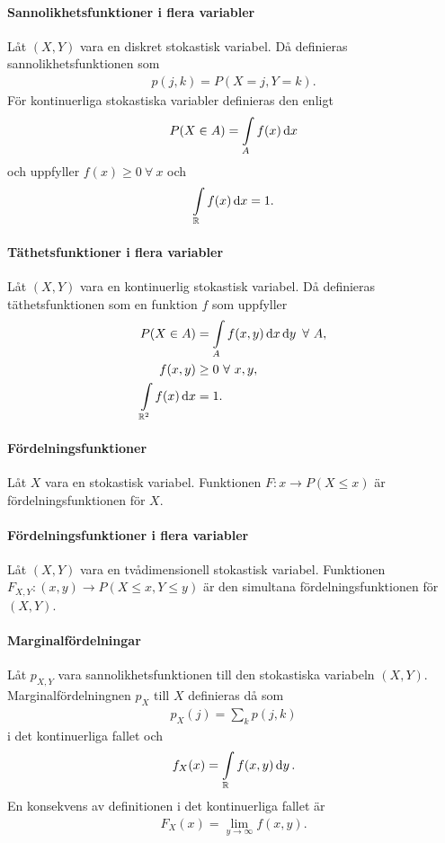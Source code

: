 \paragraph{Sannolikhetsfunktioner i flera variabler}
Låt $(X, Y)$ vara en diskret stokastisk variabel. Då definieras sannolikhetsfunktionen som
\begin{align*}
	p(j, k) = P(X = j, Y = k).
\end{align*}
För kontinuerliga stokastiska variabler definieras den enligt
\begin{align*}
	P(X\in A) = \int\limits_{A}{}f(x)\dd{x}
\end{align*}
och uppfyller $f(x)\geq 0\ \forall\ x$ och
\begin{align*}
	\int\limits_{\mathbb{R}}{}f(x)\dd{x} = 1.
\end{align*}

\paragraph{Täthetsfunktioner i flera variabler}
Låt $(X, Y)$ vara en kontinuerlig stokastisk variabel. Då definieras täthetsfunktionen som en funktion $f$ som uppfyller
\begin{align*}
	P(X\in A)            &= \int\limits_{A}f(x, y)\dd{x}\dd{y}\ \forall\ A, \\
	f(x, y)              &\geq 0\ \forall\ x, y, \\
	\integ{\R^2}{}{f}{x} &= 1.
\end{align*}

\paragraph{Fördelningsfunktioner}
Låt $X$ vara en stokastisk variabel. Funktionen $F: x\to P(X\leq x)$ är fördelningsfunktionen för $X$.

\paragraph{Fördelningsfunktioner i flera variabler}
Låt $(X, Y)$ vara en tvådimensionell stokastisk variabel. Funktionen $F_{X, Y}: (x, y)\to P(X\leq x, Y\leq y)$ är den simultana fördelningsfunktionen för $(X, Y)$.

\paragraph{Marginalfördelningar}
Låt $p_{X, Y}$ vara sannolikhetsfunktionen till den stokastiska variabeln $(X, Y)$. Marginalfördelningnen $p_{X}$ till $X$ definieras då som
\begin{align*}
	p_{X}(j) = \sum\limits_{k}p(j, k)
\end{align*}
i det kontinuerliga fallet och
\begin{align*}
	f_{X}(x) = \int\limits_{\mathbb{R}}f(x, y)\dd{y}.
\end{align*}
En konsekvens av definitionen i det kontinuerliga fallet är
\begin{align*}
	F_{X}(x) = \lim\limits_{y\to\infty}f(x, y).
\end{align*}

